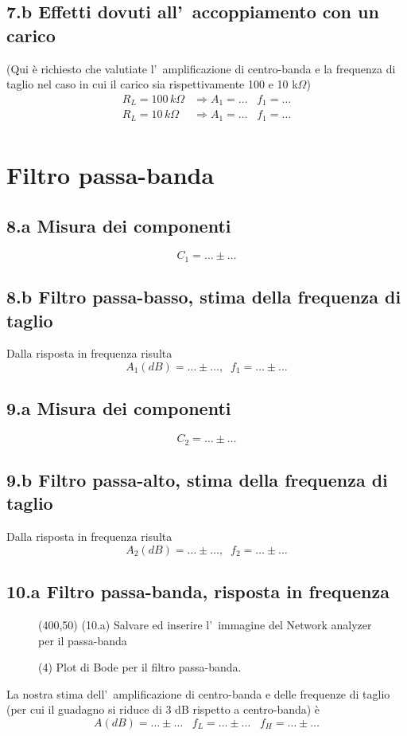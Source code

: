 \documentclass[10pt,a4paper]{article}
\begin{document}
\subsection*{7.b Effetti dovuti all'~accoppiamento con un carico}
(Qui \`e richiesto che valutiate l'~amplificazione di centro-banda e la 
frequenza di taglio nel 
caso in cui il carico sia rispettivamente 100 e 10 k$\Omega$)
\[
\begin{array}{rl}
R_L=100 \,k\Omega & \Rightarrow A_1 = \ldots\;\;\; f_1 = \ldots\\
R_L=10 \,k\Omega & \Rightarrow A_1 = \ldots\;\;\; f_1 = \ldots\\
\end{array}
\]

\section*{Filtro passa-banda}

\subsection*{8.a Misura dei componenti}
\[ 
C_1 = \ldots\pm \ldots
\]

\subsection*{8.b Filtro passa-basso, stima della frequenza di taglio}
Dalla risposta in frequenza risulta
\[
A_1(dB) = \ldots \pm \ldots,\;\;f_1 = \ldots\pm \ldots
\]

\subsection*{9.a Misura dei componenti}
\[ 
C_2 = \ldots\pm \ldots
\]

\subsection*{9.b Filtro passa-alto, stima della frequenza di taglio}
Dalla risposta in frequenza risulta
\[
A_2(dB) = \ldots \pm \ldots,\;\;f_2 = \ldots\pm \ldots
\]

\subsection*{10.a Filtro passa-banda, risposta in frequenza}
\begin{figure}[h]
\centering
\framebox(400,50){ (10.a) Salvare ed inserire l'~immagine del Network analyzer 
per il passa-banda}
\caption{(4) Plot di Bode per il filtro passa-banda.}
\end{figure}
La nostra stima dell'~amplificazione di centro-banda e delle frequenze di 
taglio (per cui il guadagno si riduce di 3 dB rispetto a centro-banda) \`e
\[
A(dB) = \ldots\pm \ldots \;\;\;f_{L} = \ldots\pm \ldots\;\;\;f_{H} = \ldots\pm 
\ldots
\]
\end{document}
